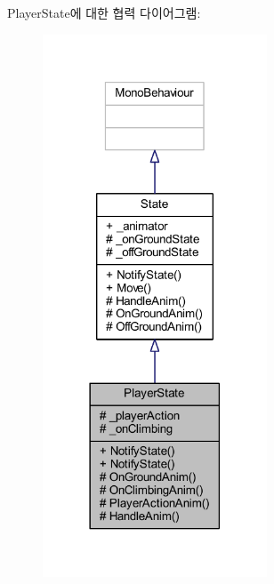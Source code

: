 Player\+State에 대한 협력 다이어그램\+:\nopagebreak
\begin{figure}[H]
\begin{center}
\leavevmode
\includegraphics[width=189pt]{df/dfa/class_player_state__coll__graph}
\end{center}
\end{figure}
